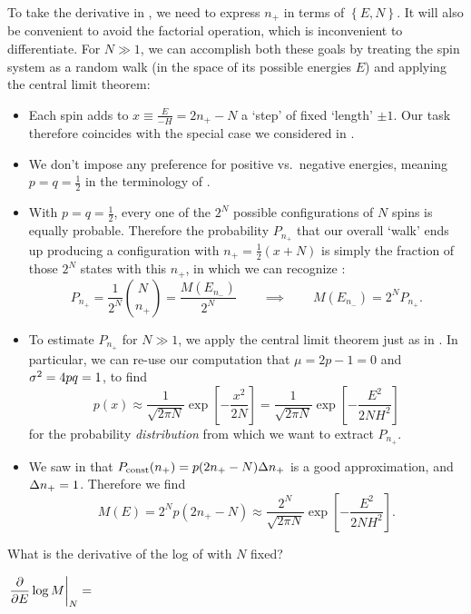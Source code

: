 To take the derivative in , we need to express $n_+$ in terms of $\left\{E, N\right\}$.
It will also be convenient to avoid the factorial operation, which is inconvenient to differentiate.
For $N \gg 1$, we can accomplish both these goals by treating the spin system as a random walk (in the space of its possible energies $E$) and applying the central limit theorem: \\[-24 pt]
\begin{itemize} %
  \item Each spin adds to $x \equiv \frac{E}{-H} = 2n_+ - N$ a `step' of fixed `length' $\pm 1$.
        Our task therefore coincides with the special case we considered in .
  \item We don't impose any preference for positive vs.\ negative energies, meaning $p = q = \frac{1}{2}$ in the terminology of .
  \item With $p = q = \frac{1}{2}$, every one of the $2^N$ possible configurations of $N$ spins is equally probable.
        Therefore the probability $P_{n_+}$ that our overall `walk' ends up producing a configuration with $n_+ = \frac{1}{2}\left(x + N\right)$ is simply the fraction of those $2^N$ states with this $n_+$, in which we can recognize :
        \begin{equation*}
          P_{n_+} = \frac{1}{2^N} \binom{N}{n_+} = \frac{M(E_{n_-})}{2^N} \qquad \implies \qquad M(E_{n_-}) = 2^N P_{n_+}.
        \end{equation*}
  \item To estimate $P_{n_+}$ for $N \gg 1$, we apply the central limit theorem just as in .
        In particular, we can re-use our computation that $\mu = 2p - 1 = 0$ and $\sigma^2 = 4pq = 1$, to find
        \begin{equation*}
          p(x) \approx \frac{1}{\sqrt{2\pi N}}\exp\left[-\frac{x^2}{2N}\right] = \frac{1}{\sqrt{2\pi N}}\exp\left[-\frac{E^2}{2NH^2}\right]
        \end{equation*}
        for the probability \textit{distribution} from which we want to extract $P_{n_+}$.
  \item We saw in  that $P_{\text{const}}(n_+) = p(2n_+ - N) \Delta n_+$ is a good approximation, and $\Delta n_+ = 1$.
        Therefore we find
        \begin{equation}
          \label{eq:CLT_states}
          M(E) = 2^N p(2n_+ - N) \approx \frac{2^N}{\sqrt{2\pi N}}\exp\left[-\frac{E^2}{2NH^2}\right].
        \end{equation}
\end{itemize}
What is the derivative of the log of  with $N$ fixed?
\begin{mdframed}
  $\displaystyle \left.\frac{\partial }{\partial E} \log M\right|_N = $ \\[100 pt]
\end{mdframed}

